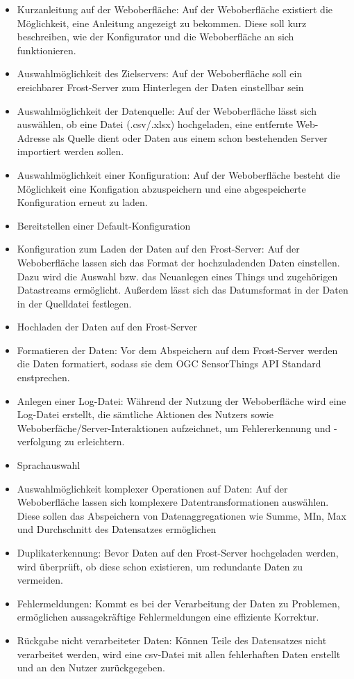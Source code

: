 \documentclass[12 pt]{article}
\begin{document}
\begin{itemize}
\item Kurzanleitung auf der Weboberfläche: Auf der Weboberfläche existiert die Möglichkeit, eine Anleitung angezeigt zu bekommen. Diese soll kurz beschreiben, wie der Konfigurator und die Weboberfläche an sich funktionieren.
\item Auswahlmöglichkeit des Zielservers: Auf der Weboberfläche soll ein ereichbarer Frost-Server zum Hinterlegen der Daten einstellbar sein
\item Auswahlmöglichkeit der Datenquelle: Auf der Weboberfläche lässt sich auswählen, ob eine Datei (.csv/.xlsx) hochgeladen, eine entfernte Web-Adresse als Quelle dient oder Daten aus einem schon bestehenden Server importiert werden sollen.
\item Auswahlmöglichkeit einer Konfiguration: Auf der Weboberfläche besteht die Möglichkeit eine Konfigation abzuspeichern und eine abgespeicherte Konfiguration erneut zu laden.
\item Bereitstellen einer Default-Konfiguration
\item Konfiguration zum Laden der Daten auf den Frost-Server: Auf der Weboberfläche lassen sich das Format der hochzuladenden Daten einstellen. Dazu wird die Auswahl bzw. das Neuanlegen eines Things und zugehörigen Datastreams ermöglicht. Außerdem lässt sich das Datumsformat in der Daten in der Quelldatei festlegen.
\item Hochladen der Daten auf den Frost-Server
\item Formatieren der Daten: Vor dem Abspeichern auf dem Frost-Server werden die Daten formatiert, sodass sie dem OGC SensorThings API Standard enstprechen.
\item Anlegen einer Log-Datei: Während der Nutzung der Weboberfläche wird eine Log-Datei erstellt, die sämtliche Aktionen des Nutzers sowie Weboberfäche/Server-Interaktionen aufzeichnet, um Fehlererkennung und -verfolgung zu erleichtern.
\item Sprachauswahl
\item Auswahlmöglichkeit komplexer Operationen auf Daten: Auf der Weboberfläche lassen sich komplexere Datentransformationen auswählen. Diese sollen das Abspeichern von Datenaggregationen wie Summe, MIn, Max und Durchschnitt des Datensatzes ermöglichen
\item Duplikaterkennung: Bevor Daten auf den Frost-Server hochgeladen werden, wird überprüft, ob diese schon existieren, um redundante Daten zu vermeiden.
\item Fehlermeldungen: Kommt es bei der Verarbeitung der Daten zu Problemen, ermöglichen aussagekräftige Fehlermeldungen eine effiziente Korrektur.
\item Rückgabe nicht verarbeiteter Daten: Können Teile des Datensatzes nicht verarbeitet werden, wird eine csv-Datei mit allen fehlerhaften Daten erstellt und an den Nutzer zurückgegeben.
\end{itemize}
\end{document}
